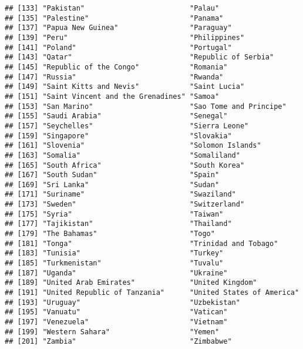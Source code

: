 \documentclass[]{article}
\begin{document}
\begin{verbatim}
## [133] "Pakistan"                         "Palau"                           
## [135] "Palestine"                        "Panama"                          
## [137] "Papua New Guinea"                 "Paraguay"                        
## [139] "Peru"                             "Philippines"                     
## [141] "Poland"                           "Portugal"                        
## [143] "Qatar"                            "Republic of Serbia"              
## [145] "Republic of the Congo"            "Romania"                         
## [147] "Russia"                           "Rwanda"                          
## [149] "Saint Kitts and Nevis"            "Saint Lucia"                     
## [151] "Saint Vincent and the Grenadines" "Samoa"                           
## [153] "San Marino"                       "Sao Tome and Principe"           
## [155] "Saudi Arabia"                     "Senegal"                         
## [157] "Seychelles"                       "Sierra Leone"                    
## [159] "Singapore"                        "Slovakia"                        
## [161] "Slovenia"                         "Solomon Islands"                 
## [163] "Somalia"                          "Somaliland"                      
## [165] "South Africa"                     "South Korea"                     
## [167] "South Sudan"                      "Spain"                           
## [169] "Sri Lanka"                        "Sudan"                           
## [171] "Suriname"                         "Swaziland"                       
## [173] "Sweden"                           "Switzerland"                     
## [175] "Syria"                            "Taiwan"                          
## [177] "Tajikistan"                       "Thailand"                        
## [179] "The Bahamas"                      "Togo"                            
## [181] "Tonga"                            "Trinidad and Tobago"             
## [183] "Tunisia"                          "Turkey"                          
## [185] "Turkmenistan"                     "Tuvalu"                          
## [187] "Uganda"                           "Ukraine"                         
## [189] "United Arab Emirates"             "United Kingdom"                  
## [191] "United Republic of Tanzania"      "United States of America"        
## [193] "Uruguay"                          "Uzbekistan"                      
## [195] "Vanuatu"                          "Vatican"                         
## [197] "Venezuela"                        "Vietnam"                         
## [199] "Western Sahara"                   "Yemen"                           
## [201] "Zambia"                           "Zimbabwe"
\end{verbatim}
\end{document}
